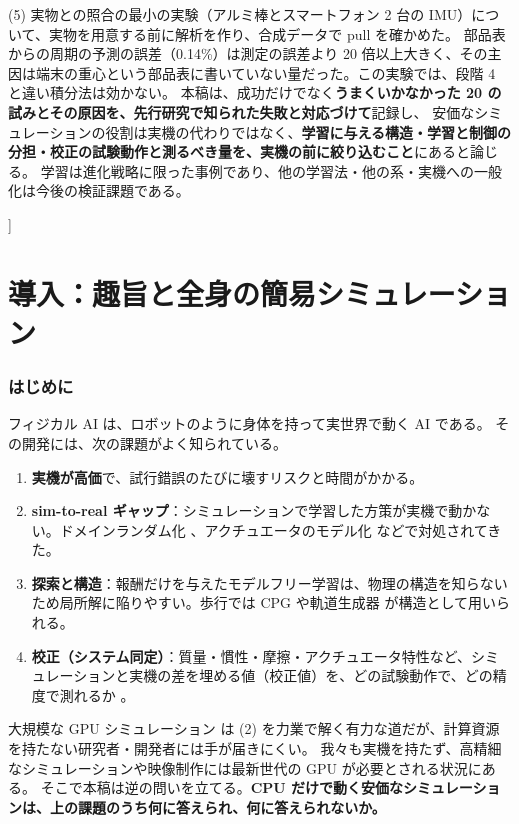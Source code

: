 \documentclass[paper=a4paper,fontsize=10pt,twocolumn,column_gap=2zw,line_length=24zw,number_of_lines=46,head_space=20mm]{jlreq}
\begin{document}
\begin{@twocolumnfalse}
\begin{center}
\begin{minipage}{0.9\textwidth}
(5) 実物との照合の最小の実験（アルミ棒とスマートフォン 2 台の IMU）について、実物を用意する前に解析を作り、合成データで pull を確かめた。
部品表からの周期の予測の誤差（0.14\%）は測定の誤差より 20 倍以上大きく、その主因は端末の重心という部品表に書いていない量だった。この実験では、段階 4 と違い積分法は効かない。
本稿は、成功だけでなく\textbf{うまくいかなかった 20 の試みとその原因を、先行研究で知られた失敗と対応づけて}記録し、
安価なシミュレーションの役割は実機の代わりではなく、\textbf{学習に与える構造・学習と制御の分担・校正の試験動作と測るべき量を、実機の前に絞り込むこと}にあると論じる。
学習は進化戦略に限った事例であり、他の学習法・他の系・実機への一般化は今後の検証課題である。
\end{minipage}\end{center}
\vspace{1em}
\end{@twocolumnfalse}
]

\part{導入：趣旨と全身の簡易シミュレーション}

\section{はじめに}\label{sec:intro}

フィジカル AI は、ロボットのように身体を持って実世界で動く AI である。
その開発には、次の課題がよく知られている。
\begin{enumerate}\setlength{\itemsep}{0pt}
\item \textbf{実機が高価}で、試行錯誤のたびに壊すリスクと時間がかかる。
\item \textbf{sim-to-real ギャップ}：シミュレーションで学習した方策が実機で動かない。ドメインランダム化 \cite{tobin2017,peng2018}、アクチュエータのモデル化 \cite{hwangbo2019} などで対処されてきた。
\item \textbf{探索と構造}：報酬だけを与えたモデルフリー学習は、物理の構造を知らないため局所解に陥りやすい。歩行では CPG \cite{ijspeert2008} や軌道生成器 \cite{iscen2018} が構造として用いられる。
\item \textbf{校正（システム同定）}：質量・慣性・摩擦・アクチュエータ特性など、シミュレーションと実機の差を埋める値（校正値）を、どの試験動作で、どの精度で測れるか \cite{atkeson1986,gautier1990}。
\end{enumerate}

大規模な GPU シミュレーション \cite{makoviychuk2021} は (2) を力業で解く有力な道だが、計算資源を持たない研究者・開発者には手が届きにくい。
我々も実機を持たず、高精細なシミュレーションや映像制作には最新世代の GPU が必要とされる状況にある。
そこで本稿は逆の問いを立てる。\textbf{CPU だけで動く安価なシミュレーションは、上の課題のうち何に答えられ、何に答えられないか。}
\end{document}
